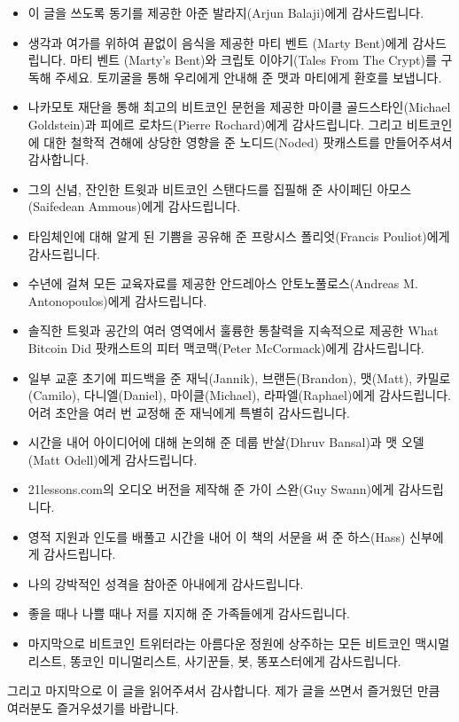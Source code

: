 \begin{itemize}
\begin{comment}
		\item Thanks to my wife for putting up with me and my obsessive nature.
		\item Thanks to my family for supporting me during both the good times and the bad.
		\item Last but not least, thanks to all the bitcoin maximalists, shitcoin minimalists, shills, bots, and shitposters which reside in the beautiful garden that is Bitcoin twitter.
	\end{comment}
	\item 이 글을 쓰도록 동기를 제공한 아준 발라지(Arjun Balaji)에게 감사드립니다.
	\item 생각과 여가를 위하여 끝없이 음식을 제공한 마티 벤트 (Marty Bent)에게 감사드립니다. 마티 벤트 (Marty’s Bent)와 크립토 이야기(Tales From The Crypt)를 구독해 주세요. 토끼굴을 통해 우리에게 안내해 준 맷과 마티에게 환호를 보냅니다.
	\item 나카모토 재단을 통해 최고의 비트코인 문헌을 제공한 마이클 골드스타인(Michael Goldstein)과 피에르 로차드(Pierre Rochard)에게 감사드립니다. 그리고 비트코인에 대한 철학적 견해에 상당한 영향을 준 노디드(Noded) 팟캐스트를 만들어주셔서 감사합니다.
	\item 그의 신념, 잔인한 트윗과 비트코인 스탠다드를 집필해 준 사이페딘 아모스(Saifedean Ammous)에게 감사드립니다.
	\item 타임체인에 대해 알게 된 기쁨을 공유해 준 프랑시스 폴리엇(Francis Pouliot)에게 감사드립니다.
	\item 수년에 걸쳐 모든 교육자료를 제공한 안드레아스 안토노풀로스(Andreas M. Antonopoulos)에게 감사드립니다.
	\item 솔직한 트윗과 공간의 여러 영역에서 훌륭한 통찰력을 지속적으로 제공한 What Bitcoin Did 팟캐스트의 피터 맥코맥(Peter McCormack)에게 감사드립니다.
	\item 일부 교훈 초기에 피드백을 준 재닉(Jannik), 브랜든(Brandon), 맷(Matt), 카밀로(Camilo), 다니엘(Daniel), 마이클(Michael), 라파엘(Raphael)에게 감사드립니다. 어려 초안을 여러 번 교정해 준 재닉에게 특별히 감사드립니다.
	\item 시간을 내어 아이디어에 대해 논의해 준 데룹 반살(Dhruv Bansal)과 맷 오델(Matt Odell)에게 감사드립니다.
	\item 21lessons.com의 오디오 버전을 제작해 준 가이 스완(Guy Swann)에게 감사드립니다.
	\item 영적 지원과 인도를 배풀고 시간을 내어 이 책의 서문을 써 준 하스(Hass) 신부에게 감사드립니다.
	\item 나의 강박적인 성격을 참아준 아내에게 감사드립니다.
	\item 좋을 때나 나쁠 때나 저를 지지해 준 가족들에게 감사드립니다.
	\item 마지막으로 비트코인 트위터라는 아름다운 정원에 상주하는 모든 비트코인 맥시멀리스트, 똥코인 미니멀리스트, 사기꾼들, 봇, 똥포스터에게 감사드립니다.
\end{itemize}


그리고 마지막으로 이 글을 읽어주셔서 감사합니다. 
제가 글을 쓰면서 즐거웠던 만큼 여러분도 즐거우셨기를 바랍니다.
